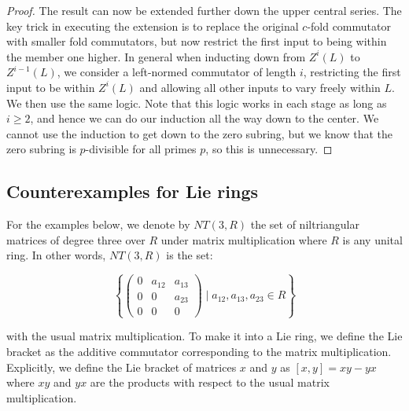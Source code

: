 \begin{proof}
  The result can now be extended further down the upper central
  series. The key trick in executing the extension is to replace the
  original $c$-fold commutator with smaller fold commutators, but now
  restrict the first input to being within the member one higher. In
  general when inducting down from $Z^i(L)$ to $Z^{i-1}(L)$, we
  consider a left-normed commutator of length $i$, restricting the
  first input to be within $Z^i(L)$ and allowing all other inputs to
  vary freely within $L$. We then use the same logic. Note that this
  logic works in each stage as long as $i \ge 2$, and hence we can do
  our induction all the way down to the center. We cannot use the
  induction to get down to the zero subring, but we know that the zero
  subring is $p$-divisible for all primes $p$, so this is unnecessary.
\end{proof}

\subsection{Counterexamples for Lie rings}\label{sec:lie-ring-ctex}

For the examples below, we denote by $NT(3,R)$ the set of
niltriangular matrices of degree three over $R$ under matrix
multiplication where $R$ is any unital ring. In other words, $NT(3,R)$
is the set:

$$\left \{\begin{pmatrix}
0 & a_{12} & a_{13} \\
0 & 0 & a_{23}\\
0 & 0 & 0\end{pmatrix} \mid a_{12},a_{13},a_{23} \in R \right \}$$

with the usual matrix multiplication. To make it into a Lie ring, we
define the Lie bracket as the additive commutator corresponding to the
matrix multiplication. Explicitly, we define the Lie bracket of
matrices $x$ and $y$ as $[x,y] = xy - yx$ where $xy$ and $yx$ are the
products with respect to the usual matrix multiplication.

